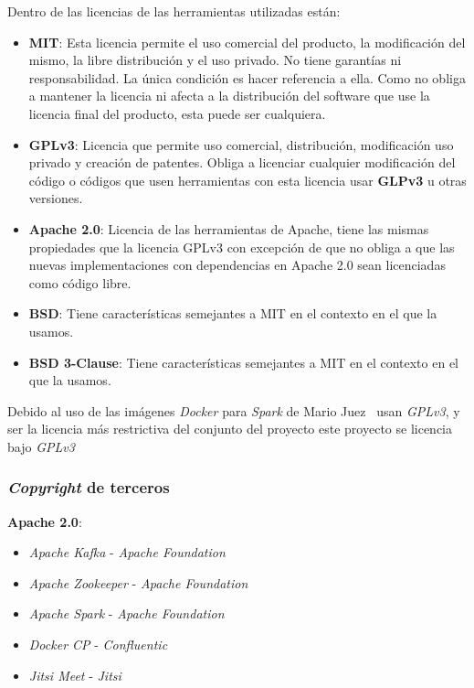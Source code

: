 Dentro de las licencias de las herramientas utilizadas están:
\begin{itemize}
		\item \textbf{MIT}: Esta licencia permite el uso comercial del producto, la modificación del mismo, la libre distribución y el uso privado. No tiene garantías ni responsabilidad. La única condición es hacer referencia a ella. Como no obliga a mantener la licencia ni afecta a la distribución del software que use la licencia final del producto, esta puede ser cualquiera.
		
		\item \textbf{GPLv3}: Licencia que permite uso comercial, distribución, modificación uso privado y creación de patentes. Obliga a licenciar
cualquier modificación del código o códigos que usen herramientas con esta licencia usar \textbf{GLPv3} u otras versiones.
		
		\item \textbf{Apache 2.0}: Licencia de las herramientas de Apache, tiene las mismas propiedades que la licencia GPLv3 con excepción de que no obliga a que las nuevas implementaciones con dependencias en Apache 2.0 sean licenciadas como código libre.

		\item \textbf{BSD}: Tiene características semejantes a MIT en el contexto en el que la usamos.
		
		\item \textbf{BSD 3-Clause}: Tiene características semejantes a MIT en el contexto en el que la usamos.
\end{itemize}

Debido al uso de las imágenes \textit{Docker} para \textit{Spark} de Mario Juez~\cite{juez2019docker} usan \textit{GPLv3}, y ser la licencia más restrictiva del conjunto del proyecto este proyecto se licencia bajo \textit{GPLv3}

\subsubsection{\textit{Copyright} de terceros}

\textbf{Apache 2.0}:
\begin{itemize}
	\item \textit{Apache Kafka} - \textit{Apache Foundation}
	\item \textit{Apache Zookeeper} - \textit{Apache Foundation}
	\item \textit{Apache Spark} - \textit{Apache Foundation}
	\item \textit{Docker CP} - \textit{Confluentic}
	\item \textit{Jitsi Meet} - \textit{Jitsi}
\end{itemize}

